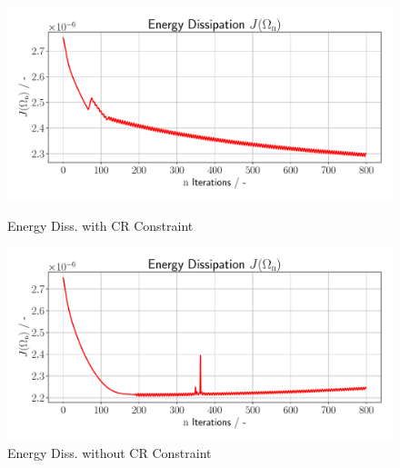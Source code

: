 \begin{figure}[h]
    \begin{minipage}{.5\textwidth}
        \centering
        \includegraphics[width=1\textwidth]{figures/energy_diss_plot.pdf}
        \caption{Energy Diss. with CR Constraint}
        \label{plot_ref_norm}
    \end{minipage}
    \begin{minipage}{.5\textwidth}
        \centering
        \includegraphics[width=1\textwidth]{figures/energy_diss_plot_bad.pdf}
        \caption{Energy Diss. without CR Constraint}
        \label{plot_ref_bndnorm}
    \end{minipage}
\end{figure}

